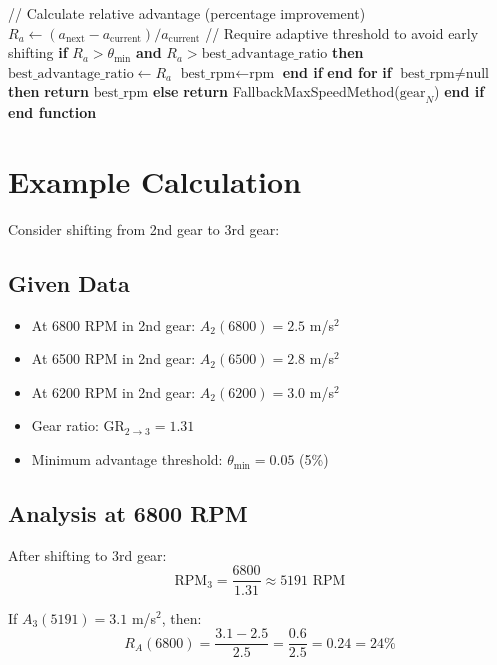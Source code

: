 \documentclass[12pt]{article}
\begin{document}
\begin{algorithmic}
\STATE
\STATE \quad \quad // Calculate relative advantage (percentage improvement)
\STATE \quad \quad $R_a \gets (a_{\text{next}} - a_{\text{current}}) / a_{\text{current}}$
\STATE
\STATE \quad \quad // Require adaptive threshold to avoid early shifting
\STATE \quad \quad \textbf{if} $R_a > \theta_{\min}$ \textbf{and} $R_a > \text{best\_advantage\_ratio}$ \textbf{then}
\STATE \quad \quad \quad $\text{best\_advantage\_ratio} \gets R_a$
\STATE \quad \quad \quad $\text{best\_rpm} \gets \text{rpm}$
\STATE \quad \quad \textbf{end if}
\STATE \quad \textbf{end for}
\STATE
\STATE \quad \textbf{if} $\text{best\_rpm} \neq \text{null}$ \textbf{then}
\STATE \quad \quad \textbf{return} $\text{best\_rpm}$
\STATE \quad \textbf{else}
\STATE \quad \quad \textbf{return} FallbackMaxSpeedMethod($\text{gear}_N$)
\STATE \quad \textbf{end if}
\STATE \textbf{end function}
\end{algorithmic}

\section{Example Calculation}

Consider shifting from 2nd gear to 3rd gear:

\subsection{Given Data}
\begin{itemize}
    \item At 6800 RPM in 2nd gear: $A_2(6800) = 2.5$ m/s$^2$
    \item At 6500 RPM in 2nd gear: $A_2(6500) = 2.8$ m/s$^2$
    \item At 6200 RPM in 2nd gear: $A_2(6200) = 3.0$ m/s$^2$
    \item Gear ratio: $\text{GR}_{2 \to 3} = 1.31$
    \item Minimum advantage threshold: $\theta_{\min} = 0.05$ (5\%)
\end{itemize}

\subsection{Analysis at 6800 RPM}
After shifting to 3rd gear:
\begin{equation}
\text{RPM}_3 = \frac{6800}{1.31} \approx 5191 \text{ RPM}
\end{equation}

If $A_3(5191) = 3.1$ m/s$^2$, then:
\begin{equation}
R_A(6800) = \frac{3.1 - 2.5}{2.5} = \frac{0.6}{2.5} = 0.24 = 24\%
\end{equation}
\end{document}
